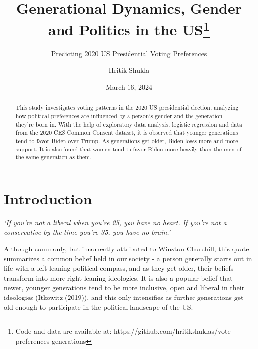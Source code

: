 \documentclass[
  letterpaper,
  DIV=11,
  numbers=noendperiod]{scrartcl}
\title{Generational Dynamics, Gender and Politics in the US\thanks{Code
and data are available at:
https://github.com/hritikshuklas/vote-preferences-generations}}
\subtitle{Predicting 2020 US Presidential Voting Preferences}
\author{Hritik Shukla}
\date{March 16, 2024}
\begin{document}
\maketitle
\begin{abstract}
This study investigates voting patterns in the 2020 US presidential
election, analyzing how political preferences are influenced by a
person's gender and the generation they're born in. With the help of
exploratory data analysis, logistic regression and data from the 2020
CES Common Consent dataset, it is observed that younger generations tend
to favor Biden over Trump. As generations get older, Biden loses more
and more support. It is also found that women tend to favor Biden more
heavily than the men of the same generation as them.
\end{abstract}
\ifdefined\Shaded\renewenvironment{Shaded}{\begin{tcolorbox}[breakable, interior hidden, frame hidden, boxrule=0pt, enhanced, sharp corners, borderline west={3pt}{0pt}{shadecolor}]}{\end{tcolorbox}}\fi

\hypertarget{sec-intro}{%
\section{Introduction}\label{sec-intro}}

\emph{`If you're not a liberal when you're 25, you have no heart. If
you're not a conservative by the time you're 35, you have no brain.'}

Although commonly, but incorrectly attributed to Winston Churchill, this
quote summarizes a common belief held in our society - a person
generally starts out in life with a left leaning political compass, and
as they get older, their beliefs transform into more right leaning
ideologies. It is also a popular belief that newer, younger generations
tend to be more inclusive, open and liberal in their ideologies
(Itkowitz (2019)), and this only intensifies as further generations get
old enough to participate in the political landscape of the US.
\end{document}
